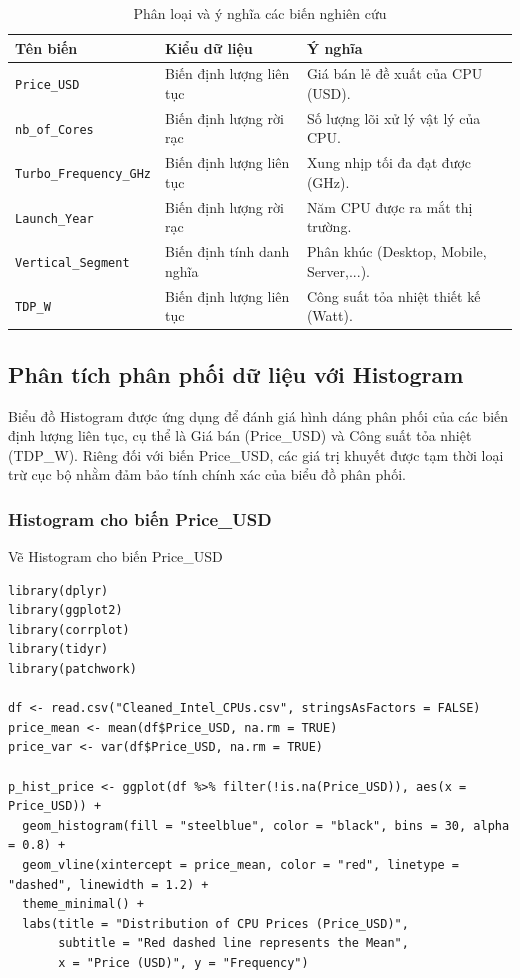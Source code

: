 \documentclass[12pt, a4paper]{article}
\begin{document}
\begin{table}[H]
    \centering
    \renewcommand{\arraystretch}{1.4} 
    \begin{tabular}{|p{4.5cm}|p{5cm}|p{5.5cm}|}
        \hline
        \textbf{Tên biến} & \textbf{Kiểu dữ liệu} & \textbf{Ý nghĩa} \\
        \hline
        \texttt{Price\_USD} & Biến định lượng liên tục & Giá bán lẻ đề xuất của CPU (USD). \\
        \hline
        \texttt{nb\_of\_Cores} & Biến định lượng rời rạc & Số lượng lõi xử lý vật lý của CPU. \\
        \hline
        \texttt{Turbo\_Frequency\_GHz} & Biến định lượng liên tục & Xung nhịp tối đa đạt được (GHz). \\
        \hline
        \texttt{Launch\_Year} & Biến định lượng rời rạc & Năm CPU được ra mắt thị trường. \\
        \hline
        \texttt{Vertical\_Segment} & Biến định tính danh nghĩa & Phân khúc (Desktop, Mobile, Server,...). \\
        \hline
        \texttt{TDP\_W} & Biến định lượng liên tục & Công suất tỏa nhiệt thiết kế (Watt). \\
        \hline
    \end{tabular}
    \caption{Phân loại và ý nghĩa các biến nghiên cứu}
    \label{tab:phan_loai_bien}
\end{table}

\subsection{Phân tích phân phối dữ liệu với Histogram}
Biểu đồ Histogram được ứng dụng để đánh giá hình dáng phân phối của các biến định lượng liên tục, cụ thể là Giá bán (Price\_USD) và Công suất tỏa 
nhiệt (TDP\_W). Riêng đối với biến Price\_USD, các giá trị khuyết được tạm thời loại trừ cục bộ nhằm đảm bảo tính chính xác của 
biểu đồ phân phối.

\subsubsection{Histogram cho biến Price\_USD}
Vẽ Histogram cho biến Price\_USD
\begin{lstlisting}[style=Rstyle]
library(dplyr)
library(ggplot2)
library(corrplot)
library(tidyr)
library(patchwork)

df <- read.csv("Cleaned_Intel_CPUs.csv", stringsAsFactors = FALSE)
price_mean <- mean(df$Price_USD, na.rm = TRUE)
price_var <- var(df$Price_USD, na.rm = TRUE)

p_hist_price <- ggplot(df %>% filter(!is.na(Price_USD)), aes(x = Price_USD)) +
  geom_histogram(fill = "steelblue", color = "black", bins = 30, alpha = 0.8) +
  geom_vline(xintercept = price_mean, color = "red", linetype = "dashed", linewidth = 1.2) +
  theme_minimal() +
  labs(title = "Distribution of CPU Prices (Price_USD)",
       subtitle = "Red dashed line represents the Mean",
       x = "Price (USD)", y = "Frequency")
\end{lstlisting}
\end{document}
